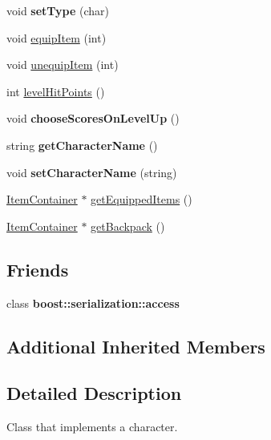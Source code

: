 \begin{DoxyCompactItemize}
\item 
\hypertarget{class_character_a7eba32ca277221f8804529722e9d939c}{}\label{class_character_a7eba32ca277221f8804529722e9d939c} 
void {\bfseries set\+Type} (char)
\item 
void \hyperlink{class_character_a2bbde472407d0c398cb602a45f5eec30}{equip\+Item} (int)
\item 
void \hyperlink{class_character_a9ee4f3f4e98b8babaa4d8e49ea44b99f}{unequip\+Item} (int)
\item 
int \hyperlink{class_character_ad47ab6e5a2671f770b5a580cb60baee7}{level\+Hit\+Points} ()
\item 
\hypertarget{class_character_a3a5ce729d6887d2c781cb5f246d122cb}{}\label{class_character_a3a5ce729d6887d2c781cb5f246d122cb} 
void {\bfseries choose\+Scores\+On\+Level\+Up} ()
\item 
\hypertarget{class_character_af23f19ad2075ea77bcd2f4e478cf0326}{}\label{class_character_af23f19ad2075ea77bcd2f4e478cf0326} 
string {\bfseries get\+Character\+Name} ()
\item 
\hypertarget{class_character_ae4c7d9343f6d25892a815e9301c0083d}{}\label{class_character_ae4c7d9343f6d25892a815e9301c0083d} 
void {\bfseries set\+Character\+Name} (string)
\item 
\hyperlink{class_item_container}{Item\+Container} $\ast$ \hyperlink{class_character_ad54a2ad63aa059d162cc67dbd0556f57}{get\+Equipped\+Items} ()
\item 
\hyperlink{class_item_container}{Item\+Container} $\ast$ \hyperlink{class_character_a92bf4b3daff50c95130f5727fd39a242}{get\+Backpack} ()
\end{DoxyCompactItemize}
\subsection*{Friends}
\begin{DoxyCompactItemize}
\item 
\hypertarget{class_character_ac98d07dd8f7b70e16ccb9a01abf56b9c}{}\label{class_character_ac98d07dd8f7b70e16ccb9a01abf56b9c} 
class {\bfseries boost\+::serialization\+::access}
\end{DoxyCompactItemize}
\subsection*{Additional Inherited Members}


\subsection{Detailed Description}
Class that implements a character. 


